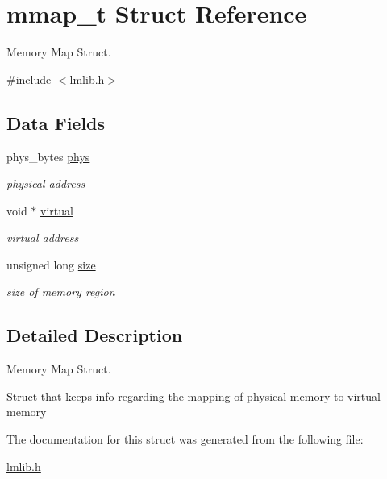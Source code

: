 \hypertarget{structmmap__t}{}\section{mmap\+\_\+t Struct Reference}
\label{structmmap__t}


Memory Map Struct.  




{\ttfamily \#include $<$lmlib.\+h$>$}

\subsection*{Data Fields}
\begin{DoxyCompactItemize}
\item 
phys\+\_\+bytes \hyperlink{group__lmlib_gab7a85fe0db943529016cf606e3a7167f}{phys}
\begin{DoxyCompactList}\small\item\em physical address \end{DoxyCompactList}\item 
void $\ast$ \hyperlink{group__lmlib_ga6a0ea2231d30f2b025e0c4b9f12dd6db}{virtual}
\begin{DoxyCompactList}\small\item\em virtual address \end{DoxyCompactList}\item 
unsigned long \hyperlink{group__lmlib_ga1e1268d164c38e4f8a4f4eb9058b0601}{size}
\begin{DoxyCompactList}\small\item\em size of memory region \end{DoxyCompactList}\end{DoxyCompactItemize}


\subsection{Detailed Description}
Memory Map Struct. 

Struct that keeps info regarding the mapping of physical memory to virtual memory 

The documentation for this struct was generated from the following file\+:\begin{DoxyCompactItemize}
\item 
\hyperlink{lmlib_8h}{lmlib.\+h}\end{DoxyCompactItemize}

